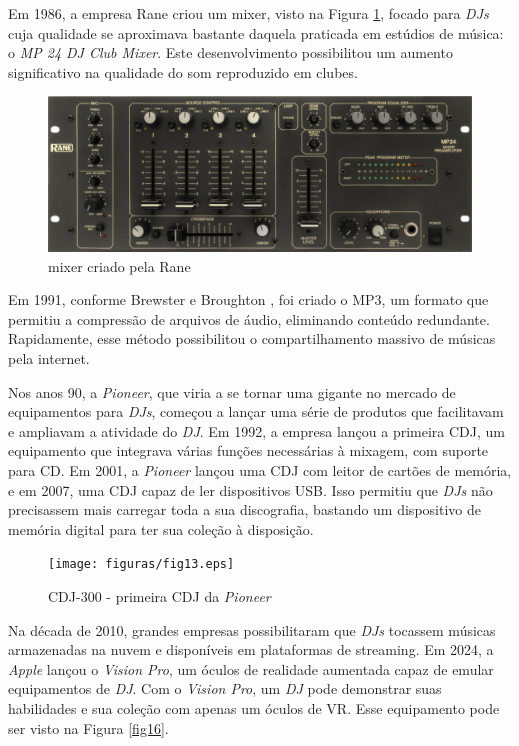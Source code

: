 Em 1986, a empresa Rane criou um mixer, visto na Figura \ref{fig15}, focado para \textit{DJs} cuja qualidade se aproximava bastante daquela praticada em estúdios de música: o \textit{MP 24 DJ Club Mixer}. Este desenvolvimento possibilitou um aumento significativo na qualidade do som reproduzido em clubes.

\begin{figure}[h]
	\centering
    \includegraphics[scale=0.3]{figuras/fig15.eps}
	\caption{mixer criado pela Rane \cite{ranecommercialMixerEvolution}}
	\label{fig15}
\end{figure}

Em 1991, conforme Brewster e Broughton \cite{lastnight}, foi criado o MP3, um formato que permitiu a compressão de arquivos de áudio, eliminando conteúdo redundante. Rapidamente, esse método possibilitou o compartilhamento massivo de músicas pela internet.

Nos anos 90, a \textit{Pioneer}, que viria a se tornar uma gigante no mercado de equipamentos para \textit{DJs}, começou a lançar uma série de produtos que facilitavam e ampliavam a atividade do \textit{DJ}. Em 1992, a empresa lançou a primeira CDJ, um equipamento que integrava várias funções necessárias à mixagem, com suporte para CD. Em 2001, a \textit{Pioneer} lançou uma CDJ com leitor de cartões de memória, e em 2007, uma CDJ capaz de ler dispositivos USB. Isso permitiu que \textit{DJs} não precisassem mais carregar toda a sua discografia, bastando um dispositivo de memória digital para ter sua coleção à disposição.

\begin{figure}[h]
	\centering
    \texttt{[image: figuras/fig13.eps]}
	\caption{CDJ-300 - primeira CDJ da \textit{Pioneer} \cite{cdj300}}
	\label{fig13}
\end{figure}

Na década de 2010, grandes empresas possibilitaram que \textit{DJs} tocassem músicas armazenadas na nuvem e disponíveis em plataformas de streaming. Em 2024, a \textit{Apple} lançou o \textit{Vision Pro}, um óculos de realidade aumentada capaz de emular equipamentos de \textit{DJ}. Com o \textit{Vision Pro}, um \textit{DJ} pode demonstrar suas habilidades e sua coleção com apenas um óculos de VR. Esse equipamento pode ser visto na Figura \ref{fig16}.

